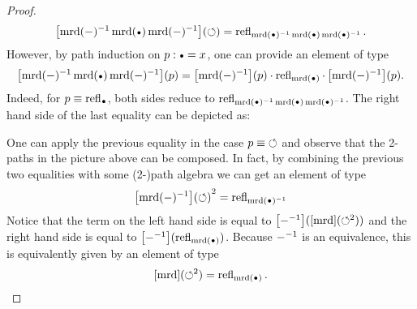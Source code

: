 \documentclass[english,a4paper]{lmcs}
\begin{document}
\begin{proof}
\begin{displaymath}
    \ap{\inv{\mrd(\blank)} \mrd(\base) \inv{\mrd(\blank)}}(\Sloop) =
    \refl{\inv{\mrd(\base)} \mrd(\base) \inv{\mrd(\base)}}.
  \end{displaymath}
  However, by path induction on $p\from \base = x$, one can provide an
  element of type
  \begin{displaymath}
    \ap{\inv{\mrd(\blank)} \mrd(\base) \inv{\mrd(\blank)}}(p) =
    \ap{\inv{\mrd(\blank)}}(p) \hcomp \refl{\mrd(\base)}
    \hcomp \ap{\inv{\mrd(\blank)}}(p).
  \end{displaymath}
  Indeed, for $p\jdeq \refl{\base}$, both sides reduce to
  $\refl{\inv{\mrd(\base)} \mrd(\base) \inv{\mrd(\base)}}$.
The right hand side of the last equality can be depicted as:

\begin{center}
\end{center}


One can apply the previous equality in the case $p\equiv \mathord{\circlearrowleft}$ and
observe that the 2-paths in the picture above can be composed.
In fact, by combining the previous two equalities
with some (2-)path algebra we can get an element of type
  \begin{displaymath}
    {\ap{\inv{\mrd(\blank)}}(\Sloop)}^2 = \refl{\inv{\mrd(\base)}}
  \end{displaymath}
  Notice that the term on the left hand side is equal to
  $\mathop{\left[{\mathord{{-}}^{-1}}\right]}(\mathop{\left[{\operatorname{\mathrm{mrd}}}\right]} (\mathord{\circlearrowleft}^2))$ and the right hand side is
  equal to $\ap{\inv{\blank}}(\refl{\mrd(\base)})$. Because
  $\mathord{{-}}^{-1}$ is an equivalence, this is equivalently given by an
  element of type
  \begin{displaymath}
    \ap\mrd(\Sloop^2) = \refl{\mrd(\base)}.
  \end{displaymath}


\end{proof}
\end{document}
